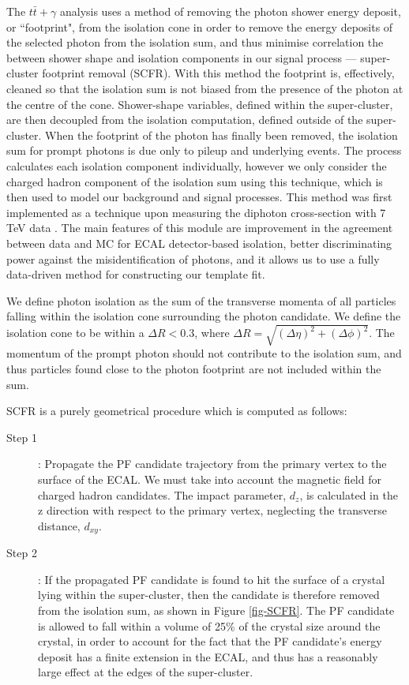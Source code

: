 The $t\bar{t}+\gamma$ analysis uses a method of removing the photon shower energy deposit, or ``footprint", from the isolation cone in order to remove the energy deposits of the selected photon from the isolation sum, and thus minimise correlation the between shower shape and isolation components in our signal process --- super-cluster footprint removal (SCFR). With this method the footprint is, effectively, cleaned so that the isolation sum is not biased from the presence of the photon at the centre of the cone. Shower-shape variables, defined within the super-cluster, are then decoupled from the isolation computation, defined outside of the super-cluster. When the footprint of the photon has finally been removed, the isolation sum for prompt photons is due only to pileup and underlying events. The process calculates each isolation component individually, however we only consider the charged hadron component of the isolation sum using this technique, which is then used to model our background and signal processes. This method was first implemented as a technique upon measuring the diphoton cross-section with 7 TeV data \cite{diffxsectdiphoton}. The main features of this module are improvement in the agreement between data and MC for ECAL detector-based isolation, better discriminating power against the misidentification of photons, and it allows us to use a fully data-driven method for constructing our template fit.

We define photon isolation as the sum of the transverse momenta of all particles falling within the isolation cone surrounding the photon candidate. We define the isolation cone to be within a $\Delta R < 0.3$, where $\Delta R = \sqrt{(\Delta\eta)^2+(\Delta\phi)^2}$. The momentum of the prompt photon should not contribute to the isolation sum, and thus particles found close to the photon footprint are not included within the sum. 

SCFR is a purely geometrical procedure which is computed as follows:

\begin{description}
	\item[Step 1]: Propagate the PF candidate trajectory from the primary vertex to the surface of the ECAL. We must take into account the magnetic field for charged hadron candidates. The impact parameter, $d_z$, is calculated in the z direction with respect to the primary vertex, neglecting the transverse distance, $d_{xy}$. 
	\item[Step 2]: If the propagated PF candidate is found to hit the surface of a crystal lying within the super-cluster, then the candidate is therefore removed from the isolation sum, as shown in Figure \ref{fig-SCFR}. The PF candidate is allowed to fall within a volume of 25\% of the crystal size around the crystal, in order to account for the fact that the PF candidate's energy deposit has a finite extension in the ECAL, and thus has a reasonably large effect at the edges of the super-cluster. 
\end{description}

